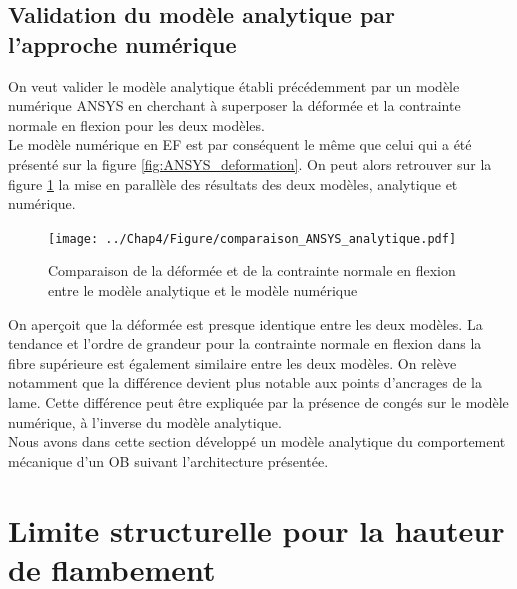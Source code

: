 		\subsection{Validation du modèle analytique par l'approche numérique} 
On veut valider le modèle analytique établi précédemment par un modèle numérique ANSYS en cherchant à superposer la déformée et la contrainte normale en flexion pour les deux modèles.\\
Le modèle numérique en EF est par conséquent le même que celui qui a été présenté sur la figure \ref{fig:ANSYS_deformation}. On peut alors retrouver sur la figure \ref{fig:comparaison_ANSYS_analytique}
la mise en parallèle des résultats des deux modèles, analytique et numérique.
\begin{figure}[!htbp]
\begin{center}
    \captionsetup{justification=centering}
	\texttt{[image: ../Chap4/Figure/comparaison\_ANSYS\_analytique.pdf]}
	\caption{Comparaison de la déformée et de la contrainte normale en flexion entre le modèle analytique et le modèle numérique}
	\label{fig:comparaison_ANSYS_analytique}
\end{center}
\end{figure}
On aperçoit que la déformée est presque identique entre les deux modèles. La tendance et l'ordre de grandeur pour la contrainte normale en flexion dans la fibre supérieure est également similaire entre les deux modèles. On relève notamment que la différence devient plus notable aux points d'ancrages de la lame. Cette différence peut être expliquée par la présence de congés sur le modèle numérique, à l'inverse du modèle analytique.\\
Nous avons dans cette section développé un modèle analytique du comportement mécanique d'un OB suivant l'architecture présentée.

\section{Limite structurelle pour la hauteur de flambement}
\label{sec:3.3_Limite structurelle pour la hauteur de flambement}
 
